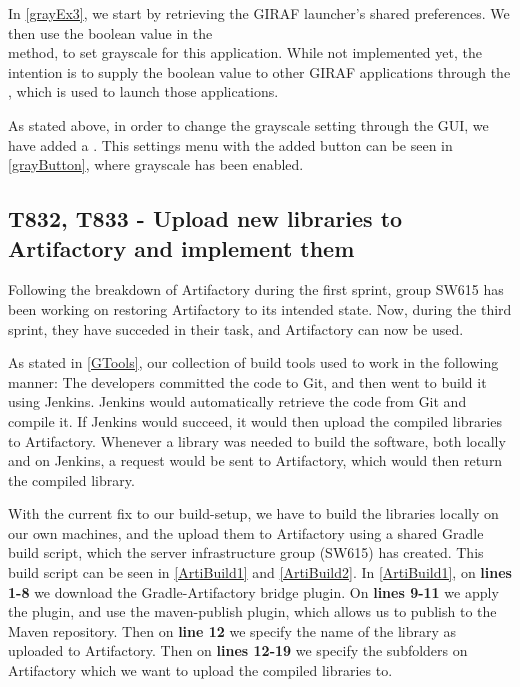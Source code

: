 In \autoref{grayEx3}, we start by retrieving the GIRAF launcher's shared
preferences. We then use the boolean
 value in the \\
 method, to set grayscale for this
application. While not implemented yet, the intention is to supply the boolean
value to other GIRAF applications through the , which is
used to launch those applications.\nl

As stated above, in order to change the grayscale setting through the GUI, we
have added a . This settings menu with the added button can
be seen in \autoref{grayButton}, where grayscale has been enabled. 



\subsection{T832, T833 - Upload new libraries to Artifactory and implement them}

Following the breakdown of Artifactory during the first sprint, group SW615 has
been working on restoring Artifactory to its intended state. Now, during the
third sprint, they have succeded in their task, and Artifactory can now be
used.\nl

As stated in \autoref{GTools}, our collection of build tools used to work in
the following manner: 
The developers committed the code to Git, and then went to
build it using Jenkins. Jenkins would automatically retrieve the code
from Git and compile it. If Jenkins would succeed, it would then upload the
compiled libraries to Artifactory. Whenever a library was needed to build the
software, both locally and on Jenkins, a request would be sent to Artifactory,
which would then return the compiled library.\nl

With the current fix to our build-setup, we have to build the libraries locally
on our own machines, and the upload them to Artifactory using a shared Gradle
build script, which the server infrastructure group (SW615) has created. This
build script can be seen in \autoref{ArtiBuild1} and \autoref{ArtiBuild2}. In
\autoref{ArtiBuild1}, on \textbf{lines 1-8} we download the Gradle-Artifactory
bridge plugin\citep{Gradle-Artifactory}. On \textbf{lines 9-11} we apply the
plugin, and use the maven-publish plugin, which allows us to publish to the
Maven repository. Then on \textbf{line 12} we specify the name of the library as
uploaded to Artifactory. Then on \textbf{lines 12-19} we specify the
subfolders on Artifactory which we want to upload the compiled libraries to.\nl


